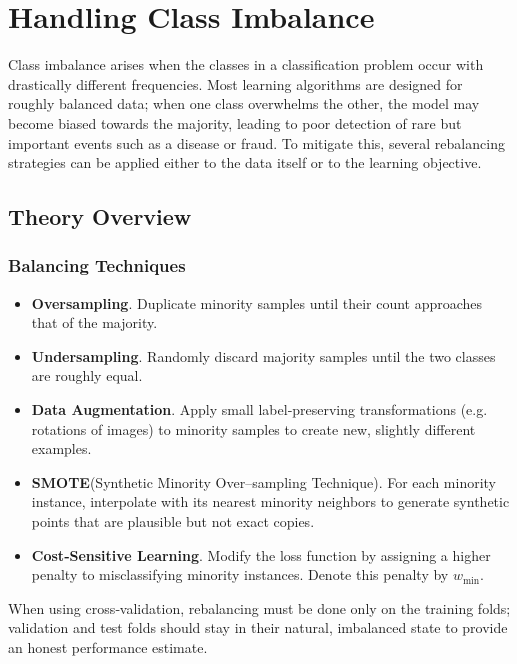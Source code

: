 \documentclass[12pt, a4paper]{article}
\begin{document}
\section{Handling Class Imbalance}

Class imbalance arises when the classes in a classification problem occur with drastically different frequencies.  
Most learning algorithms are designed for roughly balanced data; when one class overwhelms the other, the model may become biased towards the majority, leading to poor detection of rare but important events such as a disease or fraud.  
To mitigate this, several rebalancing strategies can be applied either to the data itself or to the learning objective.

\subsection{Theory Overview}

\subsubsection{Balancing Techniques}
\begin{itemize}
    \item \textbf{Oversampling}.  Duplicate minority samples until their count approaches that of the majority.  
    \item \textbf{Undersampling}.  Randomly discard majority samples until the two classes are roughly equal.  
    \item \textbf{Data Augmentation}.  Apply small label‑preserving transformations (e.g. rotations of images) to minority samples to create new, slightly different examples.  
    \item \textbf{SMOTE}\;(Synthetic Minority Over–sampling Technique).  For each minority instance, interpolate with its nearest minority neighbors to generate synthetic points that are plausible but not exact copies.  
    \item \textbf{Cost‑Sensitive Learning}.  Modify the loss function by assigning a higher penalty to misclassifying minority instances. Denote this penalty by \(w_{\text{min}}\).  
\end{itemize}

When using cross‑validation, rebalancing must be done only on the training folds; validation and test folds should stay in their natural, imbalanced state to provide an honest performance estimate.
\end{document}

